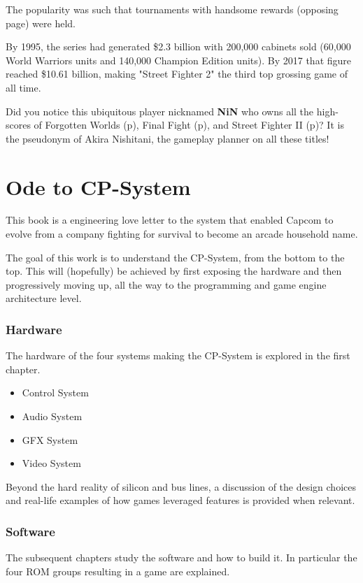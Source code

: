 The popularity was such that tournaments with handsome rewards (opposing page) were held. 

By 1995, the series had generated \$2.3 billion with 200,000 cabinets sold\cite{usgamer20160101} (60,000 World Warriors units and 140,000 Champion Edition units). By 2017 that figure reached \$10.61 billion\cite{gamerevolution20140126}, making "Street Fighter 2" the third top grossing game of all time.

\begin{trivia}
Did you notice this ubiquitous player nicknamed \textbf{NiN} who owns all the high-scores of Forgotten Worlds (p\pageref{nin_fw}), Final Fight (p\pageref{nin_ff}), and Street Fighter II (p\pageref{nin_sf2})? It is the pseudonym of Akira Nishitani, the gameplay planner on all these titles!
\end{trivia}

\section{Ode to CP-System}

This book is a engineering love letter to the system that enabled Capcom to evolve from a company fighting for survival to become an arcade household name.

The goal of this work is to understand the CP-System, from the bottom to the top. This will (hopefully) be achieved by first exposing the hardware and then progressively moving up, all the way to the programming and game engine architecture level.

\subsubsection{Hardware}
The hardware of the four systems making the CP-System is explored in the first chapter.
\begin{itemize}[topsep=0pt]
\item Control System
\item Audio System
\item GFX System
\item Video System
\end{itemize}
 Beyond the hard reality of silicon and bus lines, a discussion of the design choices and real-life examples of how games leveraged features is provided when relevant.


\subsubsection{Software}
The subsequent chapters study the software and how to build it. In particular the four ROM groups resulting in a game are explained. 


